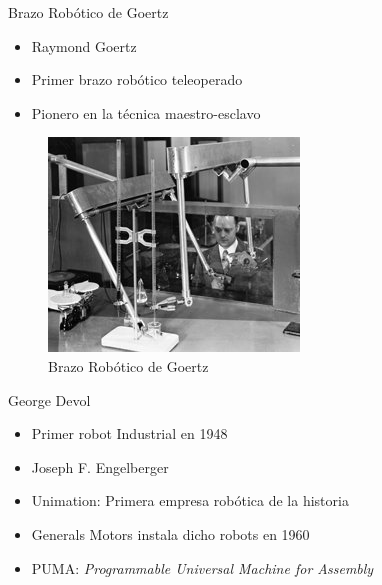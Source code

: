 

\begin{frame}[fragile]{Brazo Robótico de Goertz}
\vspace{10px}
\pause
{}
\begin{block}{}
	\begin{itemize}
		\item Raymond Goertz
		\pause
		\item Primer brazo robótico teleoperado
		\pause
		\item Pionero en la técnica maestro-esclavo
	\end{itemize}
\end{block}
\begin{figure}
		\centering
		\includegraphics[scale=3.5]{./EtapaPrimeriza/imagenes/brazo.jpg}
		\caption{Brazo Robótico de Goertz}
\end{figure}
\end{frame}




\begin{frame}[fragile]{George Devol}
\vspace{10px}
\pause
{}
\begin{block}{}
	\begin{itemize}
		\item Primer robot Industrial en 1948
		\pause
		\item  Joseph F. Engelberger
		\pause
		\item Unimation: Primera empresa robótica de la historia
		\pause 
		\item Generals Motors instala dicho robots en 1960
		\pause
		\item PUMA: \textit{Programmable Universal Machine for Assembly}
	\end{itemize}
\end{block}
\end{frame}


